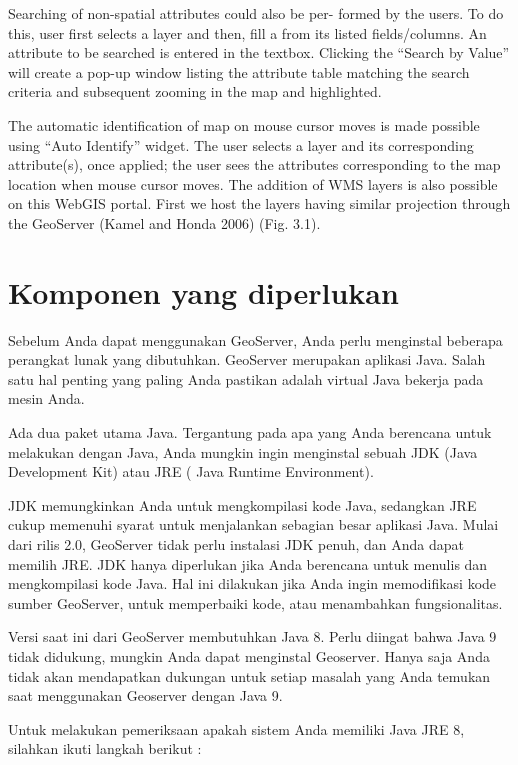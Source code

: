 \documentclass[]{book}
\begin{document}
Searching of non-spatial attributes could also be per-
formed by the users. To do this, user first selects a layer and
then, fill a from its listed fields/columns. An attribute to be
searched is entered in the textbox. Clicking the ``Search by
Value'' will create a pop-up window listing the attribute table
matching the search criteria and subsequent zooming in the
map and highlighted.

The automatic identification of map on mouse cursor
moves is made possible using ``Auto Identify'' widget. The
user selects a layer and its corresponding attribute(s), once
applied; the user sees the attributes corresponding to the map
location when mouse cursor moves.
The addition of WMS layers is also possible on this
WebGIS portal. First we host the layers having similar
projection through the GeoServer (Kamel and Honda 2006)
(Fig. 3.1).

\hypertarget{komponen-yang-diperlukan}{%
\section{Komponen yang diperlukan}\label{komponen-yang-diperlukan}}

Sebelum Anda dapat menggunakan GeoServer, Anda perlu menginstal beberapa perangkat lunak yang dibutuhkan. GeoServer merupakan aplikasi Java. Salah satu hal penting yang paling
Anda pastikan adalah virtual Java bekerja pada mesin Anda.

Ada dua paket utama Java. Tergantung pada apa yang Anda berencana untuk melakukan dengan Java, Anda mungkin
ingin menginstal sebuah JDK (Java Development Kit) atau JRE
( Java Runtime Environment).

JDK memungkinkan Anda untuk mengkompilasi kode Java, sedangkan JRE cukup memenuhi syarat
untuk menjalankan sebagian besar aplikasi Java. Mulai dari rilis 2.0, GeoServer tidak perlu instalasi JDK penuh, dan Anda
dapat memilih JRE. JDK hanya diperlukan jika Anda berencana untuk menulis dan mengkompilasi kode
Java. Hal ini dilakukan jika Anda ingin memodifikasi kode sumber GeoServer, untuk memperbaiki kode, atau menambahkan
fungsionalitas.

Versi saat ini dari GeoServer membutuhkan Java 8. Perlu diingat bahwa Java 9 tidak didukung, mungkin Anda dapat menginstal Geoserver. Hanya saja Anda tidak akan mendapatkan
dukungan untuk setiap masalah yang Anda temukan saat menggunakan Geoserver dengan Java 9.

Untuk melakukan pemeriksaan apakah sistem Anda memiliki Java JRE 8, silahkan ikuti langkah berikut :
\end{document}
